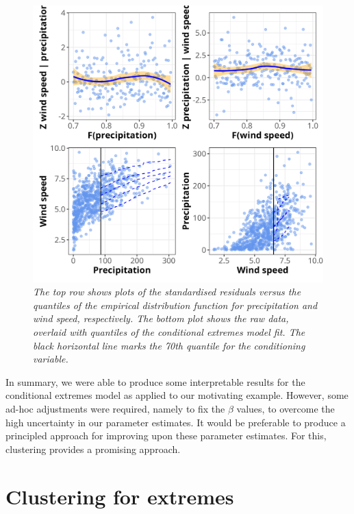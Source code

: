 \documentclass{article}
\numberwithin{equation}{section}
\begin{document}
\begin{figure}[H]
    \centering
    \includegraphics[width = 0.7\linewidth]{plots/048_diag.png}
    \caption{\emph{The top row shows plots of the standardised residuals versus the quantiles of the empirical distribution function for precipitation and wind speed, respectively. The bottom plot shows the raw data, overlaid with quantiles of the conditional extremes model fit. The black horizontal line marks the 70th quantile for the conditioning variable.}}
    \label{fig:04_diag}
\end{figure}

In summary, we were able to produce some interpretable results for the conditional extremes model as applied to our motivating example.
However, some ad-hoc adjustments were required, namely to fix the $\beta$ values, to overcome the high uncertainty in our parameter estimates. 
It would be preferable to produce a principled approach for improving upon these parameter estimates. 
For this, clustering provides a promising approach. 

\newpage
\section{Clustering for extremes}\label{sec:clustering}

\end{document}
